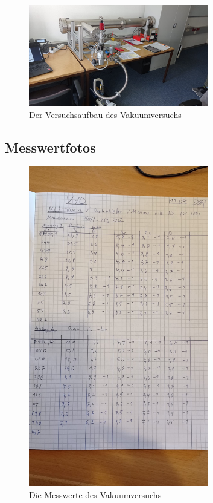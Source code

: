 \begin{figure}[h]
    \centering
    \includegraphics[width=0.7\textwidth]{latex/images/Aufbau.jpeg}
    \caption{Der Versuchsaufbau des Vakuumversuchs}
    \label{img:aufbaufoto}
\end{figure}

\subsection{Messwertfotos}

\begin{figure}[h]
    \centering
    \includegraphics[width=0.7\textwidth]{latex/images/Messwerte_1.jpeg}
    \caption{Die Messwerte des Vakuumversuchs}
\end{figure}

